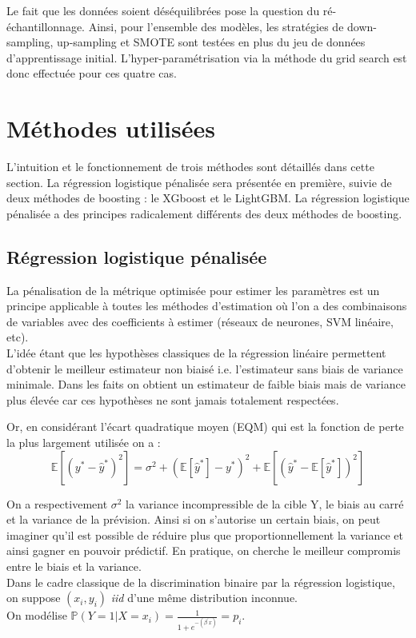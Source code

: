 \documentclass[french]{article}
\begin{document}
\begin{multicols}{2}
Le fait que les données soient déséquilibrées pose la question du ré-échantillonnage. Ainsi, pour l'ensemble des modèles, les stratégies de down-sampling, up-sampling et SMOTE sont testées en plus du jeu de données d'apprentissage initial. L'hyper-paramétrisation via la méthode du \og grid search \fg est donc effectuée pour ces quatre cas.



\section{Méthodes utilisées}
L'intuition et le fonctionnement de trois méthodes sont détaillés dans cette section. La régression logistique pénalisée sera présentée en première, suivie de deux méthodes de boosting : le XGboost et le LightGBM. La régression logistique pénalisée a des principes radicalement différents des deux méthodes de boosting.


\subsection{Régression logistique pénalisée}
La pénalisation de la métrique optimisée pour estimer les paramètres est un principe applicable à toutes les méthodes d'estimation où l’on a des combinaisons de variables avec des coefficients à estimer (réseaux de neurones, SVM linéaire, etc).\\
L'idée étant que les hypothèses classiques de la régression linéaire permettent d'obtenir le meilleur estimateur non biaisé i.e. l'estimateur sans biais de variance minimale. Dans les faits on obtient un estimateur de faible biais mais de variance plus élevée car ces hypothèses ne sont jamais totalement respectées.

Or, en considérant l'écart quadratique moyen (EQM) qui est la fonction de perte la plus largement utilisée on a : 
\[\mathbb{E}\left[\left(y^{*}-\hat{y}^{*}\right)^{2}\right]=\sigma^{2}+\left(\mathbb{E}\left[\hat{y}^{*}\right]-y^{*}\right)^{2}+\mathbb{E}\left[\left(\hat{y}^{*}-\mathbb{E}\left[\hat{y}^{*}\right]\right)^{2}\right] \]

On a respectivement $\sigma^{2}$ la variance incompressible de la cible Y, le biais au carré et la variance de la prévision. Ainsi si on s'autorise un certain biais, on peut imaginer qu'il est possible de réduire plus que proportionnellement la variance et ainsi gagner en pouvoir prédictif.
En pratique, on cherche le meilleur compromis entre le biais et la variance.\\
Dans le cadre classique de la discrimination binaire par la régression logistique, on suppose $(x_i,y_i)$ \emph{iid} d'une même distribution inconnue.\\
On modélise $\mathbb{P}(Y=1|X=x_i)=\frac{1}{1+e^{-\left(\beta^{\prime} x\right)}}=p_i$.


\end{multicols}
\end{document}
